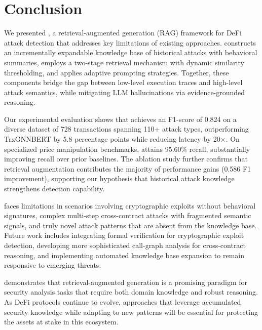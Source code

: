 
\section{Conclusion}
\label{sec:conclusion}
We presented \approach{}, a retrieval-augmented generation (RAG) framework for DeFi attack detection that addresses key limitations of existing approaches. \approach{} constructs an incrementally expandable knowledge base of historical attacks with behavioral summaries, employs a two-stage retrieval mechanism with dynamic similarity thresholding, and applies adaptive prompting strategies. Together, these components bridge the gap between low-level execution traces and high-level attack semantics, while mitigating LLM hallucinations via evidence-grounded reasoning.

Our experimental evaluation shows that \approach{} achieves an F1-score of 0.824 on a diverse dataset of 728 transactions spanning 110+ attack types, outperforming TrxGNNBERT by 5.8 percentage points while reducing latency by 20$\times$. On specialized price manipulation benchmarks, \approach{} attains 95.60\% recall, substantially improving recall over prior baselines. The ablation study further confirms that retrieval augmentation contributes the majority of performance gains (0.586 F1 improvement), supporting our hypothesis that historical attack knowledge strengthens detection capability.

\approach{} faces limitations in scenarios involving cryptographic exploits without behavioral signatures, complex multi-step cross-contract attacks with fragmented semantic signals, and truly novel attack patterns that are absent from the knowledge base. Future work includes integrating formal verification for cryptographic exploit detection, developing more sophisticated call-graph analysis for cross-contract reasoning, and implementing automated knowledge base expansion to remain responsive to emerging threats.

\approach{} demonstrates that retrieval-augmented generation is a promising paradigm for security analysis tasks that require both domain knowledge and robust reasoning. As DeFi protocols continue to evolve, approaches that leverage accumulated security knowledge while adapting to new patterns will be essential for protecting the assets at stake in this ecosystem.

